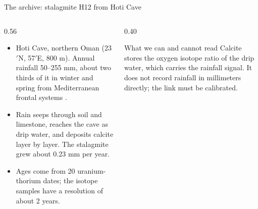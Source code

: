\documentclass[aspectratio=169,11pt]{beamer}
\begin{document}
\begin{frame}{The archive: stalagmite H12 from Hoti Cave}
  \begin{columns}[T]
    \begin{column}{0.56\textwidth}\small
      \begin{itemize}\setlength{\itemsep}{3pt}
        \item Hoti Cave, northern Oman (23$'$N,
              57$'$E, 800 m). Annual rainfall 50--255 mm,
              about two thirds of it in winter and spring from Mediterranean
              frontal systems \citep{Fleitmann2022}.
        \item Rain seeps through soil and limestone, reaches the cave as
              drip water, and deposits calcite layer by layer. The
              stalagmite grew about 0.23 mm per year.
        \item Ages come from 20 uranium-thorium dates; the isotope samples
              have a resolution of about 2 years.
      \end{itemize}
    \end{column}
    \begin{column}{0.40\textwidth}
      \begin{block}{What we can and cannot read}
        \small Calcite stores the oxygen isotope ratio of the drip water,
        which carries the rainfall signal. It does not record rainfall in
        millimeters directly; the link must be calibrated.
      \end{block}
    \end{column}
  \end{columns}
\end{frame}
\end{document}
